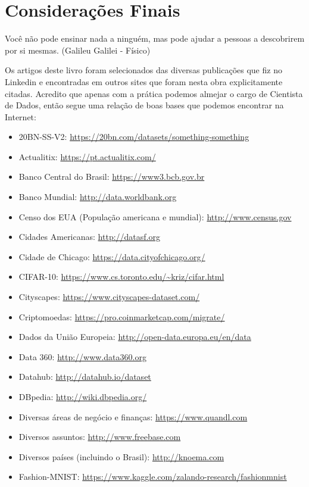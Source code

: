 \documentclass[a4paper,11pt]{book} %
\begin{document}
\chapter{Considerações Finais}
\begin{remark}
Você não pode ensinar nada a ninguém, mas pode ajudar a pessoas a descobrirem por si mesmas. (Galileu Galilei - Físico)
\end{remark}
Os artigos deste livro foram selecionados das diversas publicações que fiz no Linkedin e encontradas em outros sites que foram nesta obra explicitamente citadas. Acredito que apenas com a prática podemos almejar o cargo de Cientista de Dados, então segue uma relação de boas bases que podemos encontrar na Internet:
\begin{itemize}[noitemsep]
	\item 20BN-SS-V2: \url{https://20bn.com/datasets/something-something}
	\item Actualitix: \url{https://pt.actualitix.com/}
	\item Banco Central do Brasil: \url{https://www3.bcb.gov.br}
	\item Banco Mundial: \url{http://data.worldbank.org}
	\item Censo dos EUA (População americana e mundial): \url{http://www.census.gov}
	\item Cidades Americanas: \url{http://datasf.org}
	\item Cidade de Chicago: \url{https://data.cityofchicago.org/}
	\item CIFAR-10: \url{https://www.cs.toronto.edu/~kriz/cifar.html}
	\item Cityscapes: \url{https://www.cityscapes-dataset.com/}
	\item Criptomoedas: \url{https://pro.coinmarketcap.com/migrate/}
	\item Dados da União Europeia: \url{http://open-data.europa.eu/en/data}
	\item Data 360: \url{http://www.data360.org}
	\item Datahub: \url{http://datahub.io/dataset}
	\item DBpedia: \url{http://wiki.dbpedia.org/}
	\item Diversas áreas de negócio e finanças: \url{https://www.quandl.com}
	\item Diversos assuntos: \url{http://www.freebase.com}
	\item Diversos países (incluindo o Brasil): \url{http://knoema.com}
	\item Fashion-MNIST: \url{https://www.kaggle.com/zalando-research/fashionmnist}

\end{itemize}
\end{document}
